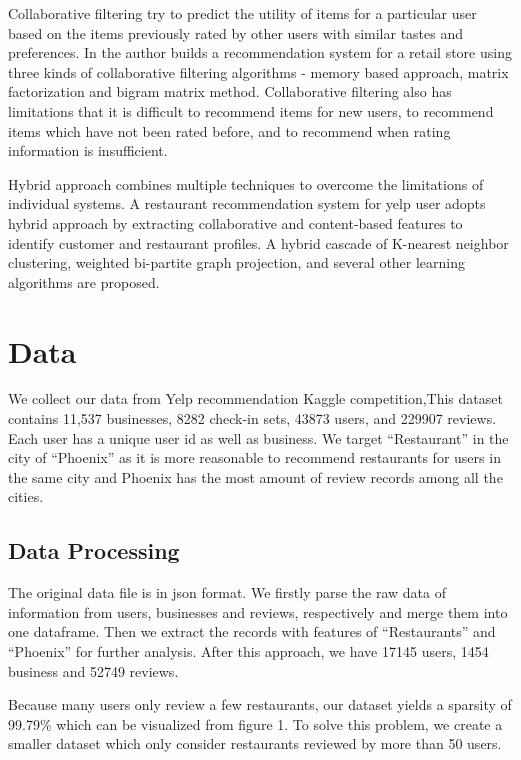\documentclass{llncs}
\begin{document}
Collaborative filtering try to predict the utility of items for a particular user based on the items previously rated by other users with similar tastes and preferences. In\cite{Bruno} the author builds a recommendation system for a retail store using three kinds of collaborative filtering algorithms - memory based approach, matrix factorization and bigram matrix method. Collaborative filtering also has limitations that it is difficult to recommend items for new users, to recommend items which have not been rated before, and to recommend when rating information is insufficient. 

Hybrid approach combines multiple techniques to overcome the limitations of individual systems. A restaurant recommendation system for yelp user\cite{Sumedh} adopts hybrid approach by extracting collaborative and content-based features to identify customer and restaurant profiles. A hybrid cascade of K-nearest neighbor clustering, weighted bi-partite graph projection, and several other learning algorithms are proposed. 

\section{Data}
We collect our data from Yelp recommendation Kaggle competition\cite{yelp},This dataset contains 11,537 businesses, 8282 check-in sets, 43873 users, and 229907 reviews. Each user has a unique user id as well as business. We target ``Restaurant'' in the city of ``Phoenix'' as it is more reasonable to recommend restaurants for users in the same city and Phoenix has the most amount of review records among all the cities.
\subsection{ Data Processing}
The original data file is in json format. We firstly parse the raw data of information from users, businesses and reviews, respectively and merge them into one dataframe. Then we extract the records with features of “Restaurants” and “Phoenix” for further analysis. After this approach, we have 17145 users, 1454 business and 52749 reviews.

Because many users only review a few restaurants, our dataset yields a sparsity of 99.79\% which can be visualized from figure 1. To solve this problem, we create a smaller dataset which only consider  restaurants reviewed by more than 50 users.
%
\end{document}
